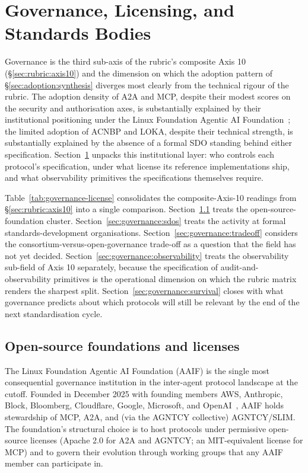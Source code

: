 \section{Governance, Licensing, and Standards Bodies}
\label{sec:governance}

Governance is the third sub-axis of the rubric's composite
Axis 10 (\S\ref{sec:rubric:axis10}) and the dimension on which
the adoption pattern of \S\ref{sec:adoption:synthesis}
diverges most clearly from the technical rigour of the
rubric. The adoption density of A2A and MCP, despite their
modest scores on the security and authorisation axes, is
substantially explained by their institutional positioning
under the Linux Foundation Agentic AI Foundation~\cite{lf_aaif};
the limited adoption of ACNBP and LOKA, despite their
technical strength, is substantially explained by the
absence of a formal SDO standing behind either
specification. Section~\ref{sec:governance} unpacks this
institutional layer: who controls each protocol's
specification, under what license its reference
implementations ship, and what observability primitives
the specifications themselves require.

Table~\ref{tab:governance-license} consolidates the
composite-Axis-10 readings from \S\ref{sec:rubric:axis10}
into a single comparison. Section~\ref{sec:governance:foundations}
treats the open-source-foundation cluster.
Section~\ref{sec:governance:sdos} treats the activity at
formal standards-development organisations.
Section~\ref{sec:governance:tradeoff} considers the
consortium-versus-open-governance trade-off as a question
that the field has not yet decided.
Section~\ref{sec:governance:observability} treats the
observability sub-field of Axis 10 separately, because the
specification of audit-and-observability primitives is the
operational dimension on which the rubric matrix renders the
sharpest split.
Section~\ref{sec:governance:survival} closes with what
governance predicts about which protocols will still be
relevant by the end of the next standardisation cycle.



\subsection{Open-source foundations and licenses}
\label{sec:governance:foundations}

The Linux Foundation Agentic AI Foundation (AAIF) is the
single most consequential governance institution in the
inter-agent protocol landscape at the cutoff. Founded in
December 2025 with founding members AWS, Anthropic, Block,
Bloomberg, Cloudflare, Google, Microsoft, and
OpenAI~\cite{lf_aaif}, AAIF holds stewardship of MCP, A2A,
and (via the AGNTCY collective) AGNTCY/SLIM. The
foundation's structural choice is to host protocols under
permissive open-source licenses (Apache 2.0 for A2A and
AGNTCY; an MIT-equivalent license for MCP) and to govern
their evolution through working groups that any AAIF
member can participate in.

